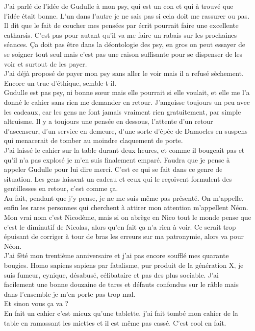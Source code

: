 J'ai parlé de l'idée de Gudulle à mon psy, qui est un con et qui à trouvé que l'idée était bonne. L'un dans l'autre je ne sais pas si cela doit me rassurer ou pas. Il dit que le fait de coucher mes pensées par écrit pourrait faire une excellente catharsis. C'est pas pour autant qu'il va me faire un rabais sur les prochaines séances. Ça doit pas être dans la déontologie des psy, en gros on peut essayer de se soigner tout seul mais c'est pas une raison suffisante pour se dispenser de les voir et surtout de les payer.\\
J'ai déjà proposé de payer mon psy sans aller le voir mais il a refusé sèchement. Encore un truc d'éthique, semble-t-il. \\

Gudulle est pas psy, ni bonne sœur mais elle pourrait si elle voulait, et elle me l'a donné le cahier sans rien me demander en retour. J'angoisse toujours un peu avec les cadeaux, car les gens ne font jamais vraiment rien gratuitement, par simple altruisme. Il y a toujours une pensée en dessous, l'attente d'un retour d'ascenseur, d'un service en demeure, d'une sorte d'épée de Damocles en suspens qui menacerait de tomber au moindre claquement de porte.\\

J'ai laissé le cahier sur la table durant deux heures, et comme il bougeait pas et qu'il n'a pas explosé je m'en suis finalement emparé. Faudra que je pense à appeler Gudulle pour lui dire merci. C'est ce qui se fait dans ce genre de situation. Les gens laissent un cadeau et ceux qui le reçoivent formulent des gentillesses en retour, c'est comme ça.\\

Au fait, pendant que j'y pense, je ne me suis même pas présenté. On m'appelle, enfin les rares personnes qui cherchent à attirer mon attention m'appellent Néon. Mon vrai nom c'est Nicodème, mais si on abrège en Nico tout le monde pense que c'est le diminutif de Nicolas, alors qu'en fait ça n'a rien à voir. Ce serait trop épuisant de corriger à tour de bras les erreurs sur ma patronymie, alors va pour Néon. \\
J'ai fêté mon trentième anniversaire et j'ai pas encore soufflé mes quarante bougies. Homo sapiens sapiens par fatalisme, pur produit de la génération X, je suis fumeur, cynique, désabusé, célibataire et pas des plus sociable. J'ai facilement une bonne douzaine de tares et défauts confondus sur le râble mais dans l'ensemble je m'en porte pas trop mal. \\

Et sinon vous ça va ? \\

En fait un cahier c'est mieux qu'une tablette, j'ai fait tombé mon cahier de la table en ramassant les miettes et il est même pas cassé. C'est cool en fait.